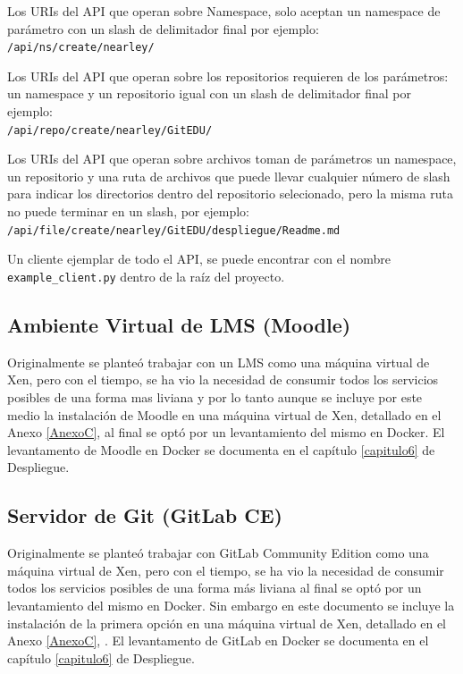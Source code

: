 Los URIs del API que operan sobre Namespace, solo aceptan un namespace de parámetro con un slash de delimitador final por ejemplo: \\
\texttt{/api/ns/create/nearley/}

Los URIs del API que operan sobre los repositorios requieren de los parámetros: un namespace y un repositorio igual con un slash de delimitador final por ejemplo: \\
\texttt{/api/repo/create/nearley/GitEDU/}

Los URIs del API que operan sobre archivos toman de parámetros un namespace, un repositorio y una ruta de archivos que puede llevar cualquier número de slash para indicar los directorios dentro del repositorio selecionado, pero la misma ruta no puede terminar en un slash, por ejemplo: \\
\texttt{/api/file/create/nearley/GitEDU/despliegue/Readme.md}

Un cliente ejemplar de todo el API, se puede encontrar con el nombre \\
\texttt{example\_client.py} dentro de la raíz del proyecto.

 
\subsection{Ambiente Virtual de LMS  (Moodle)}
\label{instalacion-moodle}
Originalmente se planteó trabajar con un LMS como una máquina virtual de Xen, pero con el tiempo, se ha vio la necesidad de consumir todos los servicios posibles de una forma mas liviana y por lo tanto aunque se incluye por este medio la instalación de Moodle en una máquina virtual de Xen, detallado en el Anexo \ref{AnexoC}, al final se optó por un levantamiento del mismo en Docker. El levantamento de Moodle en Docker se documenta en el capítulo \ref{capitulo6} de Despliegue.

 
\subsection{Servidor de Git (GitLab CE)}
Originalmente se planteó trabajar con GitLab Community Edition como una máquina virtual de Xen, pero con el tiempo, se ha vio la necesidad de consumir todos los servicios posibles de una forma más liviana al final se optó por un levantamiento del mismo en Docker. Sin embargo en este documento se incluye la instalación de la primera opción en una máquina virtual de Xen, detallado en el Anexo \ref{AnexoC}, . El levantamento de GitLab en Docker se documenta en el capítulo \ref{capitulo6} de Despliegue.

